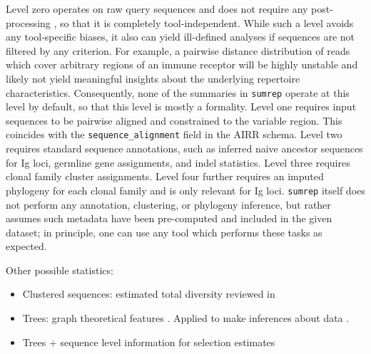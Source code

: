\documentclass{article}
\begin{document}
Level zero operates on raw query sequences and does not require any post-processing , so that it is completely tool-independent.
While such a level avoids any tool-specific biases, it also can yield ill-defined analyses if sequences are not filtered by any criterion.
For example, a pairwise distance distribution of reads which cover arbitrary regions of an immune receptor will be highly unstable and likely not yield meaningful insights about the underlying repertoire characteristics.
Consequently, none of the summaries in \texttt{sumrep} operate at this level by default, so that this level is mostly a formality.
Level one requires input sequences to be pairwise aligned and constrained to the variable region.
This coincides with the \texttt{sequence\_alignment} field in the AIRR schema.
Level two requires standard sequence annotations, such as inferred naive ancestor sequences for Ig loci, germline gene assignments, and indel statistics.
Level three requires clonal family cluster assignments.
Level four further requires an imputed phylogeny for each clonal family and is only relevant for Ig loci.
\texttt{sumrep} itself does not perform any annotation, clustering, or phylogeny inference, but rather assumes such metadata have been pre-computed and included in the given dataset; in principle, one can use any tool which performs these tasks as expected.

Other possible statistics:

\begin{itemize}
\item Clustered sequences: estimated total diversity reviewed in \cite{Mehr2012-se}
\item Trees: graph theoretical features \cite{Dunn-Walters2002-cu,Dunn-Walters2004-hv,Mehr2004-ej,Shahaf2008-cc,Budeus2015-ab,Yaari2015-ss}.
Applied to make inferences about data \cite{Steiman-Shimony2006-fm}.
\item Trees + sequence level information for selection estimates \cite{Uduman2014-pb}
\end{itemize}
\end{document}
